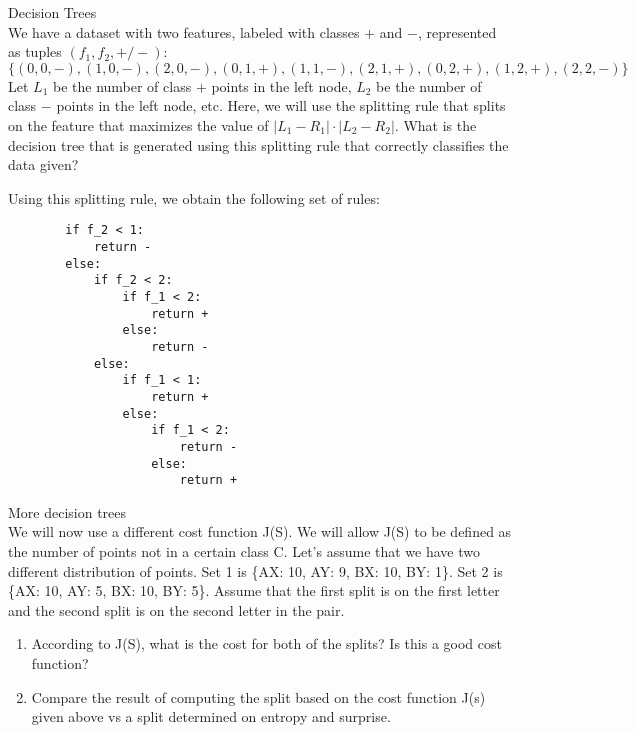 \begin{Parts}
\Part Decision Trees \\
We have a dataset with two features, labeled with classes $+$ and $-$, represented as tuples $(f_1, f_2, +/-)$: $$\{(0,0,-), (1,0,-), (2,0,-), (0,1,+), (1,1,-), (2,1,+), (0,2,+), (1,2,+), (2,2,-)\}$$ Let $L_1$ be the number of class $+$ points in the left node, $L_2$ be the number of class $-$ points in the left node, etc. Here, we will use the splitting rule that splits on the feature that maximizes the value of $|L_1-R_1| \cdot |L_2-R_2|$. What is the decision tree that is generated using this splitting rule that correctly classifies the data given? \\
\begin{solution}
    Using this splitting rule, we obtain the following set of rules:
    \begin{verbatim}
        if f_2 < 1:
            return -
        else:
            if f_2 < 2:
                if f_1 < 2:
                    return +
                else:
                    return -
            else:
                if f_1 < 1:
                    return +
                else:
                    if f_1 < 2:
                        return -
                    else:
                        return +
    \end{verbatim}
\end{solution}

\Part More decision trees \\
We will now use a different cost function J(S). We will allow J(S) to be defined as the number of points not in a certain class C. Let's assume that we have two different distribution of points. Set 1 is \{AX: 10, AY: 9, BX: 10, BY: 1\}. Set 2 is \{AX: 10, AY: 5, BX: 10, BY: 5\}. Assume that the first split is on the first letter and the second split is on the second letter in the pair. \\
\begin{enumerate}
    \item According to J(S), what is the cost for both of the splits? Is this a good cost function?
    \item Compare the result of computing the split based on the cost function J(s) given above vs a split determined on entropy and surprise.
\end{enumerate}


\end{Parts}
